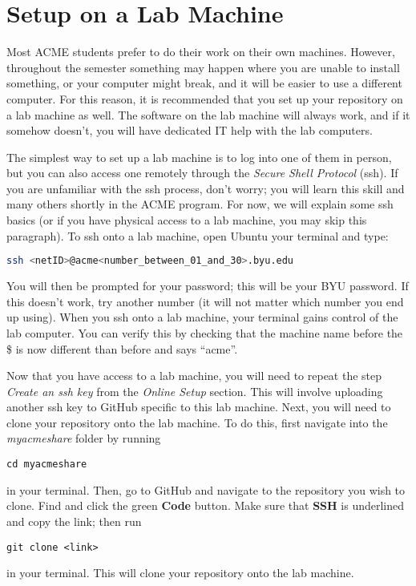 \ifbootcamp
\ifbyu
\section*{Setup on a Lab Machine}
Most ACME students prefer to do their work on their own machines.
However, throughout the semester something may happen where you are unable to install something, or your computer might break, and it will be easier to use a different computer.
For this reason, it is recommended that you set up your repository on a lab machine as well.
The software on the lab machine will always work, and if it somehow doesn't, you will have dedicated IT help with the lab computers.

The simplest way to set up a lab machine is to log into one of them in person, but you can also access one remotely through the \emph{Secure Shell Protocol} (ssh).
If you are unfamiliar with the ssh process, don't worry; you will learn this skill and many others shortly in the ACME program.
For now, we will explain some ssh basics (or if you have physical access to a lab machine, you may skip this paragraph).
To ssh onto a lab machine, open 
\ifwindows
Ubuntu
\else
your terminal
\fi
and type:
\begin{lstlisting}[language=bash]
ssh <netID>@acme<number_between_01_and_30>.byu.edu
\end{lstlisting}
You will then be prompted for your password; this will be your BYU password.
If this doesn't work, try another number (it will not matter which number you end up using).
When you ssh onto a lab machine, your terminal gains control of the lab computer.
You can verify this by checking that the machine name before the \$ is now different than before and says ``acme''.

Now that you have access to a lab machine, you will need to repeat the step \emph{Create an ssh key} from the \emph{Online Setup} section.
This will involve uploading another ssh key to GitHub specific to this lab machine.
Next, you will need to clone your repository onto the lab machine.
To do this, first navigate into the \emph{myacmeshare} folder by running 
\begin{lstlisting}
cd myacmeshare
\end{lstlisting}
in your terminal.
Then, go to GitHub and navigate to the repository you wish to clone.
Find and click the green \textbf{Code} button.
Make sure that \textbf{SSH} is underlined and copy the link; then run 
\begin{lstlisting}
git clone <link>
\end{lstlisting} 
in your terminal.
This will clone your repository onto the lab machine.

